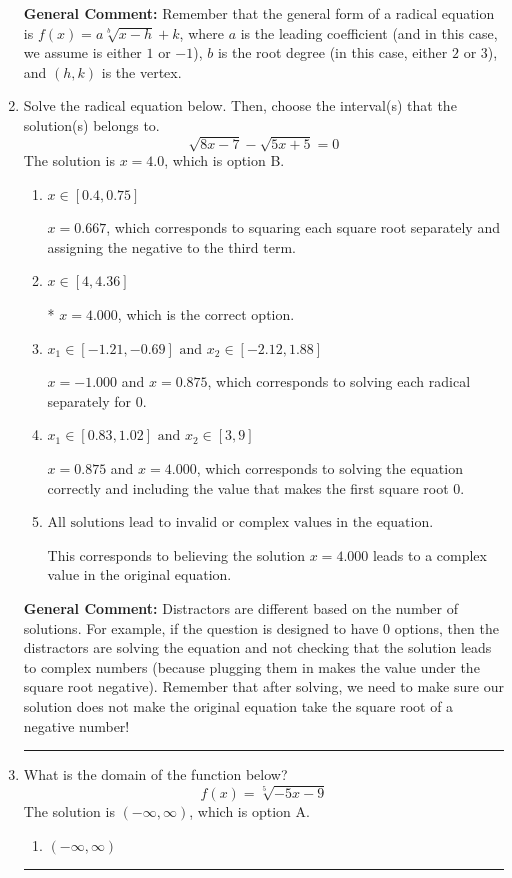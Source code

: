 \documentclass{extbook}[14pt]
\newcommand{\litem}[1]{\item #1

\rule{\textwidth}{0.4pt}}
\begin{document}
\begin{enumerate}
{\textbf{General Comment:} Remember that the general form of a radical equation is $ f(x) = a \sqrt[b]{x - h} + k$, where $a$ is the leading coefficient (and in this case, we assume is either $1$ or $-1$), $b$ is the root degree (in this case, either $2$ or $3$), and $(h, k)$ is the vertex.
}
\litem{
Solve the radical equation below. Then, choose the interval(s) that the solution(s) belongs to.
\[ \sqrt{8 x - 7} - \sqrt{5 x + 5} = 0 \]The solution is \( x = 4.0 \), which is option B.\begin{enumerate}[label=\Alph*.]
\item \( x \in [0.4,0.75] \)

$x = 0.667$, which corresponds to squaring each square root separately and assigning the negative to the third term.
\item \( x \in [4,4.36] \)

* $x = 4.000$, which is the correct option.
\item \( x_1 \in [-1.21, -0.69] \text{ and } x_2 \in [-2.12,1.88] \)

$x = -1.000$ and $x = 0.875$, which corresponds to solving each radical separately for 0.
\item \( x_1 \in [0.83, 1.02] \text{ and } x_2 \in [3,9] \)

$x = 0.875$ and $x = 4.000$, which corresponds to solving the equation correctly and including the value that makes the first square root 0.
\item \( \text{All solutions lead to invalid or complex values in the equation.} \)

This corresponds to believing the solution $x = 4.000$ leads to a complex value in the original equation.
\end{enumerate}

\textbf{General Comment:} Distractors are different based on the number of solutions. For example, if the question is designed to have 0 options, then the distractors are solving the equation and not checking that the solution leads to complex numbers (because plugging them in makes the value under the square root negative). Remember that after solving, we need to make sure our solution does not make the original equation take the square root of a negative number!
}
\litem{
What is the domain of the function below?
\[ f(x) = \sqrt[5]{-5 x - 9} \]The solution is \( (-\infty, \infty) \), which is option A.\begin{enumerate}[label=\Alph*.]
\item \( (-\infty, \infty) \)


\end{enumerate}}
\end{enumerate}
\end{document}
